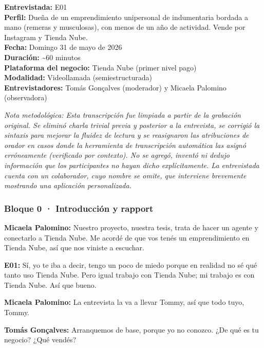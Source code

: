 ﻿
\noindent\textbf{Entrevistada:} E01\\
\noindent\textbf{Perfil:} Dueña de un emprendimiento unipersonal de indumentaria bordada a mano (remeras y musculosas), con menos de un año de actividad. Vende por Instagram y Tienda Nube.\\
\noindent\textbf{Fecha:} Domingo 31 de mayo de 2026\\
\noindent\textbf{Duración:} \textasciitilde60 minutos\\
\noindent\textbf{Plataforma del negocio:} Tienda Nube (primer nivel pago)\\
\noindent\textbf{Modalidad:} Videollamada (semiestructurada)\\
\noindent\textbf{Entrevistadores:} Tomás Gonçalves (moderador) y Micaela Palomino (observadora)

\begin{framed}
\small\noindent\textit{Nota metodológica: Esta transcripción fue limpiada a partir de la grabación original. Se eliminó charla trivial previa y posterior a la entrevista, se corrigió la sintaxis para mejorar la fluidez de lectura y se reasignaron las atribuciones de orador en casos donde la herramienta de transcripción automática las asignó erróneamente (verificado por contexto). No se agregó, inventó ni dedujo información que los participantes no hayan dicho explícitamente. La entrevistada cuenta con un colaborador, cuyo nombre se omite, que interviene brevemente mostrando una aplicación personalizada.}
\end{framed}

\subsubsection*{Bloque 0 · Introducción y rapport}

\noindent\textbf{Micaela Palomino:} Nuestro proyecto, nuestra tesis, trata de hacer un agente y conectarlo a Tienda Nube. Me acordé de que vos tenés un emprendimiento en Tienda Nube, así que nos viniste a escuchar.

\noindent\textbf{E01:} Sí, yo te iba a decir, tengo un poco de miedo porque en realidad no sé qué tanto uso Tienda Nube. Pero igual trabajo con Tienda Nube; mi trabajo es con Tienda Nube. Así que bueno.

\noindent\textbf{Micaela Palomino:} La entrevista la va a llevar Tommy, así que todo tuyo, Tommy.

\noindent\textbf{Tomás Gonçalves:} Arranquemos de base, porque yo no conozco. ¿De qué es tu negocio? ¿Qué vendés?

